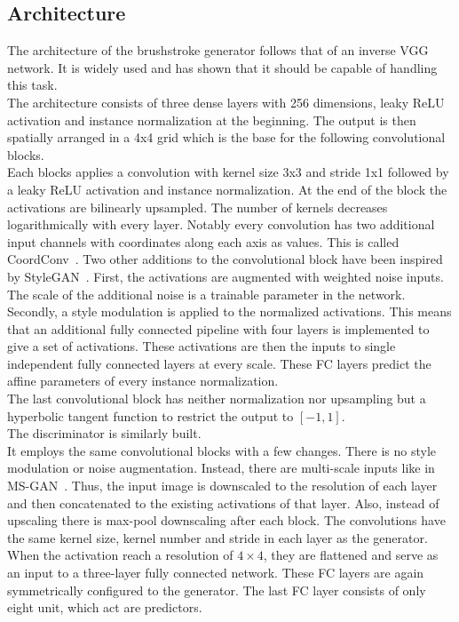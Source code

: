 \subsection{Architecture}
The architecture of the brushstroke generator follows that of an inverse VGG network.
It is widely used and has shown that it should be capable of handling this task.\\
The architecture consists of three dense layers with 256 dimensions, leaky ReLU activation and instance normalization at the beginning.
The output is then spatially arranged in a 4x4 grid which is the base for the following convolutional blocks.\\
Each blocks applies a convolution with kernel size 3x3 and stride 1x1 followed by a leaky ReLU activation and instance normalization.
At the end of the block the activations are bilinearly upsampled.
The number of kernels decreases logarithmically with every layer.
Notably every convolution has two additional input channels with coordinates along each axis as values.
This is called CoordConv~\cite{coordconv}.
Two other additions to the convolutional block have been inspired by StyleGAN~\cite{stylegan}.
First, the activations are augmented with weighted noise inputs.
The scale of the additional noise is a trainable parameter in the network.
Secondly, a style modulation is applied to the normalized activations.
This means that an additional fully connected pipeline with four layers is implemented to give a set of activations.
These activations are then the inputs to single independent fully connected layers at every scale.
These FC layers predict the affine parameters of every instance normalization.\\
The last convolutional block has neither normalization nor upsampling but a hyperbolic tangent function to restrict the output to $[-1, 1]$.\\

The discriminator is similarly built.\\
It employs the same convolutional blocks with a few changes.
There is no style modulation or noise augmentation.
Instead, there are multi-scale inputs like in MS-GAN~\cite{MSG-GAN}.
Thus, the input image is downscaled to the resolution of each layer and then concatenated to the existing activations of that layer.
Also, instead of upscaling there is max-pool downscaling after each block.
The convolutions have the same kernel size, kernel number and stride in each layer as the generator.\\
When the activation reach a resolution of $4\times4$, they are flattened and serve as an input to a three-layer fully connected network.
These FC layers are again symmetrically configured to the generator.
The last FC layer consists of only eight unit, which act are predictors.

